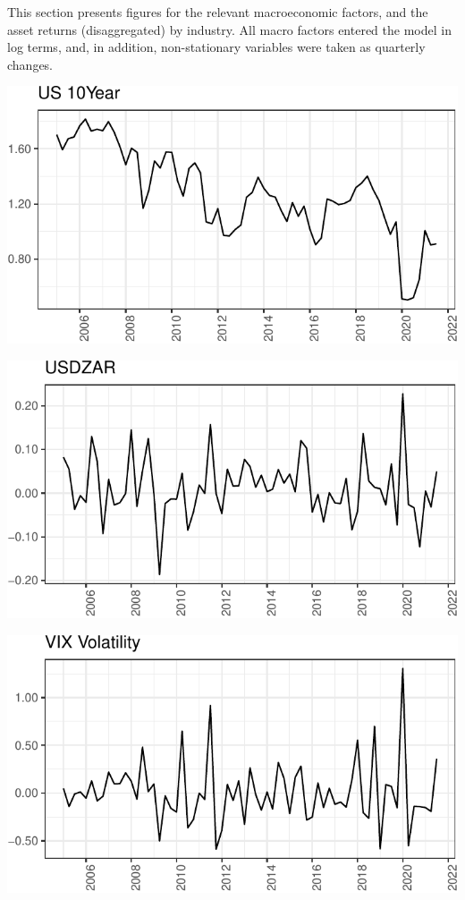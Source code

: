\documentclass[11pt,preprint, authoryear]{elsarticle}
\let\origfigure\figure
\let\endorigfigure\endfigure
\renewenvironment{figure}[1][2] {
    \expandafter\origfigure\expandafter[H]
} {
    \endorigfigure
}
\numberwithin{equation}{section}
\numberwithin{figure}{section}
\numberwithin{table}{section}
\begin{document}
This section presents figures for the relevant macroeconomic factors,
and the asset returns (disaggregated) by industry. All macro factors
entered the model in log terms, and, in addition, non-stationary
variables were taken as quarterly changes.

\begin{figure}[H]
\includegraphics{Factor-Model_files/figure-latex/unnamed-chunk-3-1} \caption{US Long-Term Bond Yields \label{Fig1}}\label{fig:unnamed-chunk-3}
\end{figure}

\begin{figure}[H]
\includegraphics{Factor-Model_files/figure-latex/unnamed-chunk-4-1} \caption{USDZAR Spot Price \label{Fig2}}\label{fig:unnamed-chunk-4}
\end{figure}

\begin{figure}[H]
\includegraphics{Factor-Model_files/figure-latex/unnamed-chunk-5-1} \caption{CBOE VIX Volatility Index \label{Fig3}}\label{fig:unnamed-chunk-5}
\end{figure}
\end{document}
